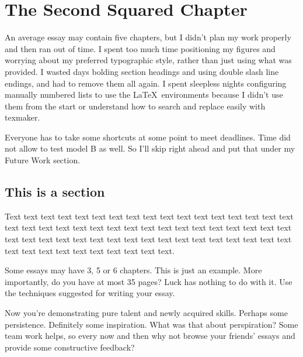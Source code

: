 \chapter{The Second Squared Chapter}

An average essay may contain five chapters, but I didn't plan my work properly
and then ran out of time. I spent too much time positioning my figures and worrying
about my preferred typographic style, rather than just using what was provided.
I wasted days bolding section headings and using double slash line endings, and 
had to remove them all again. I spent sleepless nights configuring manually numbered lists
to use the \LaTeX\ environments because I didn't use them from the start or understand
how to search and replace easily with texmaker.

Everyone has to take some shortcuts
at some point to meet deadlines. Time did not allow to test model 
B as well. So I'll skip right ahead and put that under my Future Work section.


\section{This is a section} 
Text text text text text text text text text text text text text text
text text text text text text text text text text text text text text
text text text text text text text text text text text text text text
text text text text text text text text text text text text text text
text text text text text. 

Some essays may have 3, 5 or 6 chapters. This is just an example. 
More importantly, do you have at most 35 pages?  
Luck has nothing to do with it. Use the techniques suggested for
writing your essay.

Now you're demonstrating pure talent and newly acquired skills. 
Perhaps some persistence. Definitely some inspiration. What was that about perspiration? 
Some team work helps, so every now and then why not browse your friends' essays and provide
some constructive feedback?
